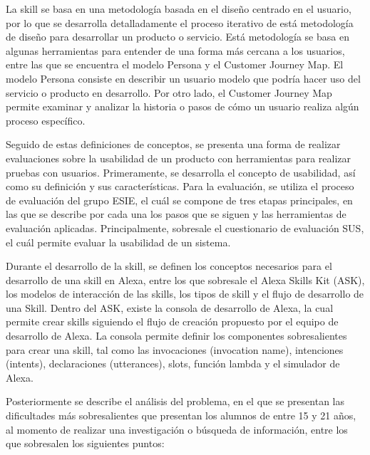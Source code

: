La skill se basa en una metodología basada en el diseño centrado en el usuario, por lo que se desarrolla detalladamente el proceso iterativo de está metodología de diseño para desarrollar un producto o servicio. Está metodología se basa en algunas herramientas para entender de una forma más cercana a los usuarios, entre las que se encuentra el modelo Persona y el Customer Journey Map. El modelo Persona consiste en describir un usuario modelo que podría hacer uso del servicio o producto en desarrollo. Por otro lado, el Customer Journey Map permite examinar y analizar la historia o pasos de cómo un usuario realiza algún proceso específico.

Seguido de estas definiciones de conceptos, se presenta una forma de realizar evaluaciones sobre la usabilidad de un producto con herramientas para realizar pruebas con usuarios. Primeramente, se desarrolla el concepto de usabilidad, así como su definición y sus características. Para la evaluación, se utiliza el proceso de evaluación del grupo ESIE, el cuál se compone de tres etapas principales, en las que se describe por cada una los pasos que se siguen y las herramientas de evaluación aplicadas. Principalmente, sobresale el cuestionario de evaluación SUS, el cuál permite evaluar la usabilidad de un sistema.

Durante el desarrollo de la skill, se definen los conceptos necesarios para el desarrollo de una skill en Alexa, entre los que sobresale el Alexa Skills Kit (ASK), los modelos de interacción de las skills, los tipos de skill y el flujo de desarrollo de una Skill. Dentro del ASK, existe la consola de desarrollo de Alexa, la cual permite crear skills siguiendo el flujo de creación propuesto por el equipo de desarrollo de Alexa. La consola permite definir los componentes sobresalientes para crear una skill, tal como las invocaciones (invocation name), intenciones (intents), declaraciones (utterances), slots, función lambda y el simulador de Alexa.

Posteriormente se describe el análisis del problema, en el que se presentan las dificultades más sobresalientes que presentan los alumnos de entre 15 y 21 años, al momento de realizar una investigación o búsqueda de información, entre los que sobresalen los siguientes puntos:

